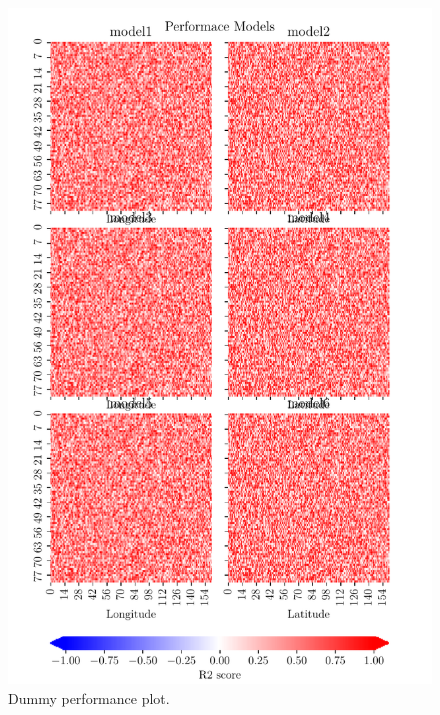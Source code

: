 \begin{figure}[ht]
    \centering
    \includegraphics{python_figs/dummy_model_performace_plot.pdf}
    \caption{Dummy performance plot.}
    \label{fig:dummy_performace_plot}
\end{figure}


